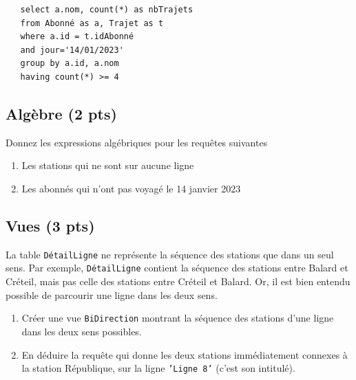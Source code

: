\begin{solution}
\begin{enumerate}
\begin{verbatim}
   select a.nom, count(*) as nbTrajets
   from Abonné as a, Trajet as t
   where a.id = t.idAbonné
   and jour='14/01/2023'
   group by a.id, a.nom
   having count(*) >= 4
\end{verbatim}
   
\end{enumerate}


\end{solution}
\subsection*{Algèbre (2 pts)}

Donnez les expressions algébriques pour les requêtes suivantes

\begin{enumerate}
  \item Les stations qui ne sont sur aucune ligne 
  \item Les abonnés qui n'ont pas voyagé le 14 janvier 2023
\end{enumerate}


\subsection*{Vues (3 pts)}

La table \texttt{DétailLigne} ne représente la séquence
des stations que dans un seul sens. 
Par exemple, \texttt{DétailLigne} contient la
séquence des stations entre Balard et Créteil,
mais pas celle des stations entre Créteil et Balard.
Or, il est bien entendu
possible de parcourir une ligne dans les deux sens.

\begin{enumerate}
  \item Créer une vue \texttt{BiDirection} montrant 
      la séquence des stations d'une ligne dans les 
	  deux sens possibles. 
  \item En déduire la requête qui donne les
     deux stations immédiatement connexes à la station République,
	 sur la ligne \texttt{'Ligne 8'} (c'est son intitulé). 
	
\end{enumerate}





